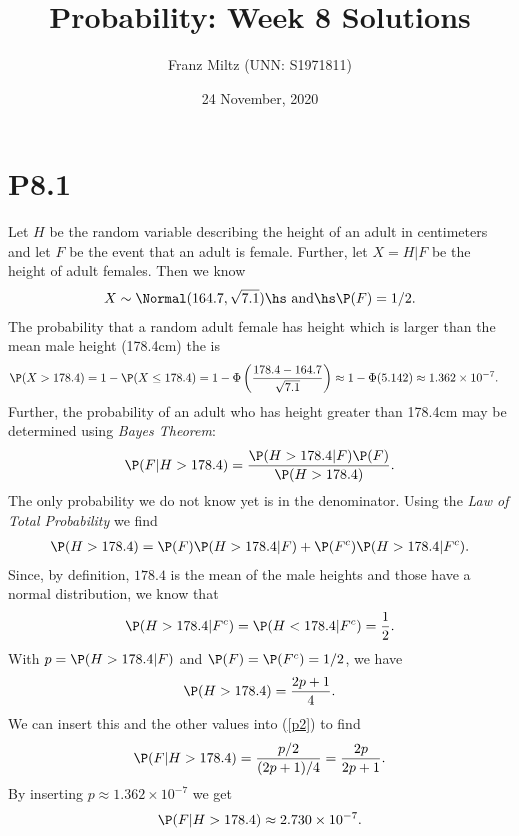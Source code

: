 \documentclass{article}
\begin{document}
\title{Probability: Week 8 Solutions}
\author{Franz Miltz (UNN: S1971811)}
\date{24 November, 2020}
\maketitle

\section*{P8.1}

Let $H$ be the random variable describing the height of an adult in centimeters
and let $F$ be the event that an adult is female. Further, let $X=H|F$ be the
height of adult females. Then we know
\begin{align*}
  X \sim \Normal(164.7, \sqrt{7.1})
  \text{\hs and\hs}
  \P(F) = 1/2.
\end{align*}
The probability that a random adult female has height which is larger than
the mean male height (178.4cm) the is
\begin{align*}
  \P(X>178.4) &= 1 - \P(X \leq 178.4) = 1 - \Phi\left(\frac{178.4-164.7}{\sqrt{7.1}}\right)
  \approx 1-\Phi(5.142) \approx 1.362\times 10^{-7}.
\end{align*}
Further, the probability of an adult who has height greater than 178.4cm
may be determined using \emph{Bayes Theorem}:
\begin{align}
  \label{p2}
  \P(F|H>178.4) = \frac{\P(H>178.4|F)\P(F)}{\P(H>178.4)}.
\end{align}
The only probability we do not know yet is in the denominator. Using the
\emph{Law of Total Probability} we find
\begin{align*}
  \P(H>178.4) = \P(F)\P(H>178.4|F) + \P(F^c)\P(H>178.4|F^c).
\end{align*}
Since, by definition, $178.4$ is the mean of the male heights and those
have a normal distribution, we know that
\begin{align*}
  \P(H>178.4|F^c) = \P(H<178.4|F^c)=\frac{1}{2}.
\end{align*}
With $p=\P(H>178.4|F)$ and $\P(F)=\P(F^c)=1/2$, we have
\begin{align*}
  \P(H>178.4) = \frac{2p+1}{4}.
\end{align*}
We can insert this and the other values into (\ref{p2}) to find 
\begin{align*}
  \P(F|H>178.4)=\frac{p/2}{(2p+1)/4}=\frac{2p}{2p+1}.
\end{align*}
By inserting $p\approx 1.362\times 10^{-7}$ we get
\begin{align*}
  \P(F|H>178.4)\approx 2.730\times 10^{-7}.
\end{align*}
\end{document}
